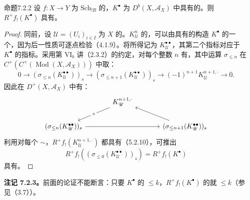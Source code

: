 \begin{SGAresult}{命题}{7.2.2}
设 $f:X\to Y$ 为 $\mathrm{Sch}_{!R}$ 的，$K^\bullet$ 为 $D^b(X,\mathscr A_X)$ 中具有的。则 $R^+f_!(K^\bullet)$ 具有。
\end{SGAresult}
\begin{proof}
同前，设 $\mathscr U=(U_i)_{i\in I}$ 为 $X$ 的。$K_{\mathscr U}^n$ 的，可以由具有的构造 $K^\bullet$ 的一个，因为后一性质可逐点检验（4.1.9）。将所得记为 $K_{\mathscr U}^{\bullet\bullet}$，其第二个指标对应于 $K^\bullet$ 的指标。采用第 VI$_b$ 讲（2.3.2）的约定，对每个整数 $n$ 有，其中运算 $\sigma_{\le n}$ 在 $C^+(C^+(\operatorname{Mod}(X,\mathscr A_X)))$ 中取：
\[0\longrightarrow(\sigma_{\le n}(K_{\mathscr U}^{\bullet\bullet}))_s
\longrightarrow(\sigma_{\le n+1}(K_{\mathscr U}^{\bullet\bullet}))_s
\longrightarrow(-1)^{n+1}K_{\mathscr U}^{n+1,\cdot}\longrightarrow0.\]
因此在 $D^+(X,\mathscr A_X)$ 中有：
\[
\begin{tikzcd}[column sep=large]
&K_{\mathscr U}^{n+1,\cdot}\arrow[dl,"\circ" description]&\\
(\sigma_{\le n}(K_{\mathscr U}^{\bullet\bullet}))_s\arrow[rr]&&(\sigma_{\le n+1}(K_{\mathscr U}^{\bullet\bullet}))_s\arrow[ul]
\end{tikzcd}
\]
利用对每个 $\sim$，$R^+f_!(K_{\mathscr U}^{n+1,\cdot})$ 都具有（5.2.10），可推出
\[R^+f_!((\sigma_{\le0}(K_{\mathscr U}^{\bullet\bullet}))_s)=R^+f_!(K^\bullet)\]
具有。
\end{proof}

\textbf{注记 7.2.3。}前面的论证不能断言：只要 $K^\bullet$ 的 $\le k$，$R^+f_!(K^\bullet)$ 的就 $\le k$（参见（3.7））。

